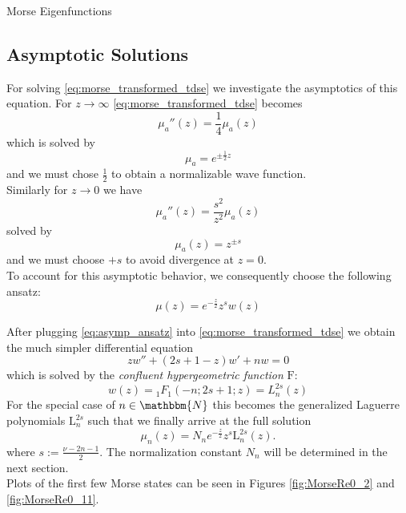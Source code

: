 \begin{chapter}{Morse Eigenfunctions}
\subsection{Asymptotic Solutions}
For solving \eqref{eq:morse_transformed_tdse} we investigate the asymptotics of this equation. For $z\to\infty$ 
\eqref{eq:morse_transformed_tdse} becomes 
\begin{equation}
   \mu_a''(z)=\frac{1}{4}\mu_a(z)
\end{equation}
which is solved by
\begin{equation}
    \mu_a=e^{\pm\frac{1}{2}z}
\end{equation}
and we must chose $\frac{1}{2}$ to obtain a normalizable wave function.\\
Similarly  for $z\to 0$ we have
\begin{equation}
 \mu_a''(z)=\frac{s^2}{z^2}\mu_a(z) 
\end{equation}
solved by
\begin{equation}
    \mu_a(z)=z^{\pm s}
\end{equation}
and we must choose $+s$ to avoid divergence at $z=0$.\\

To account for this asymptotic behavior, we consequently choose the following ansatz:
\begin{equation}
	\label{eq:asymp_ansatz}
	\mu(z)=e^{-\frac{z}{2}}z^{s}w(z)
\end{equation}

After plugging \eqref{eq:asymp_ansatz} into \eqref{eq:morse_transformed_tdse} we obtain the much simpler differential equation
\begin{equation}
	zw''+(2s+1-z)w'+nw=0
\end{equation}
which is solved by the \textit{confluent hypergeometric function} $\mathrm{F}$:
\begin{equation}
    w(z)= {}_{1}F_1(-n;2s+1;z)=L_n^{2s}(z)
\end{equation}
For the special case of $n\in\mathbbm{N}$ this becomes the generalized Laguerre polynomials $\mathrm{L}_{n}^{2s}$
such that we finally arrive at the full solution
\begin{equation}
    \label{eq:morse_function}
  \mu_{n}(z) = N_{n} e^{-\frac{z}{2}} z^{s} \mathrm{L}_{n}^{2s}(z).
\end{equation}
where $s := \frac{\nu - 2n -1}{2}$. The normalization constant $N_n$ will be determined in the next section.\\
Plots of the first few Morse states can be seen in Figures \ref{fig:MorseRe0_2} and \ref{fig:MorseRe0_11}.



\end{chapter}
